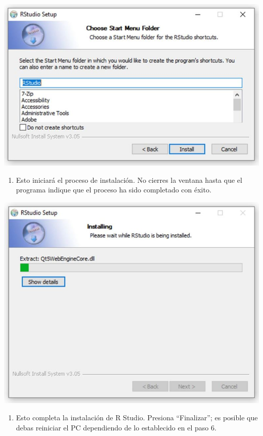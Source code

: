\documentclass[
]{book}
\providecommand{\tightlist}{%
  \setlength{\itemsep}{0pt}\setlength{\parskip}{0pt}}
\begin{document}
\includegraphics{data/R08.jpg}

\begin{enumerate}
\def\labelenumi{\arabic{enumi}.}
\setcounter{enumi}{8}
\tightlist
\item
  Esto iniciará el proceso de instalación. No cierres la ventana hasta que el programa indique que el proceso ha sido completado con éxito.
\end{enumerate}

\includegraphics{data/R09.jpg}

\begin{enumerate}
\def\labelenumi{\arabic{enumi}.}
\setcounter{enumi}{9}
\tightlist
\item
  Esto completa la instalación de R Studio. Presiona ``Finalizar''; es posible que debas reiniciar el PC dependiendo de lo establecido en el paso 6.
\end{enumerate}
\end{document}
